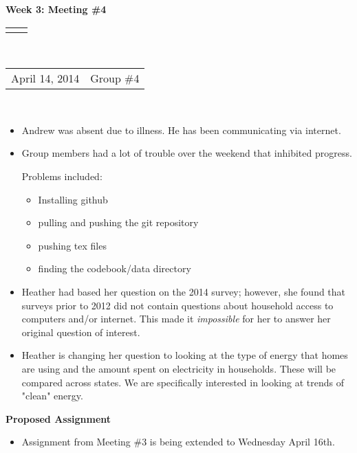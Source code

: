 \documentclass[12pt]{article}
\renewcommand{\title}[1]{\textbf{#1}\\}
\renewcommand{\line}{\begin{tabularx}{\textwidth}{X>{\raggedleft}X}\hline\\\end{tabularx}\\[-0.5cm]}
\newcommand{\leftright}[2]{\begin{tabularx}{\textwidth}{X>{\raggedleft}X}#1%
& #2\\\end{tabularx}\\[-0.5cm]}
\begin{document}
\title{Week 3: Meeting \#4 }
\line
\leftright{April 14, 2014}{Group \#4} %
\vspace{5mm}

\begin{itemize}
\item Andrew was absent due to illness.  He has been communicating via internet. 

\item Group members had a lot of trouble over the weekend that inhibited progress. 

Problems included: 
\begin{itemize}
\item Installing github
\item pulling and pushing the git repository 
\item pushing tex files
\item finding the codebook/data directory
\end{itemize}


\item Heather had based her question on the 2014 survey; however, she found that surveys prior to 2012 did not contain questions about household access to computers and/or internet.  This made it \emph{impossible} for her to answer her original question of interest. 
\item Heather is changing her question to looking at the type of energy that homes are using and the amount spent on electricity in households.  These will be compared across states. We are specifically interested in looking at trends of "clean" energy. 
\end{itemize}

\textbf{Proposed Assignment}
\begin{itemize}
\item Assignment from Meeting \#3 is being extended to Wednesday April 16th. 
\end{itemize}





\end{document}
